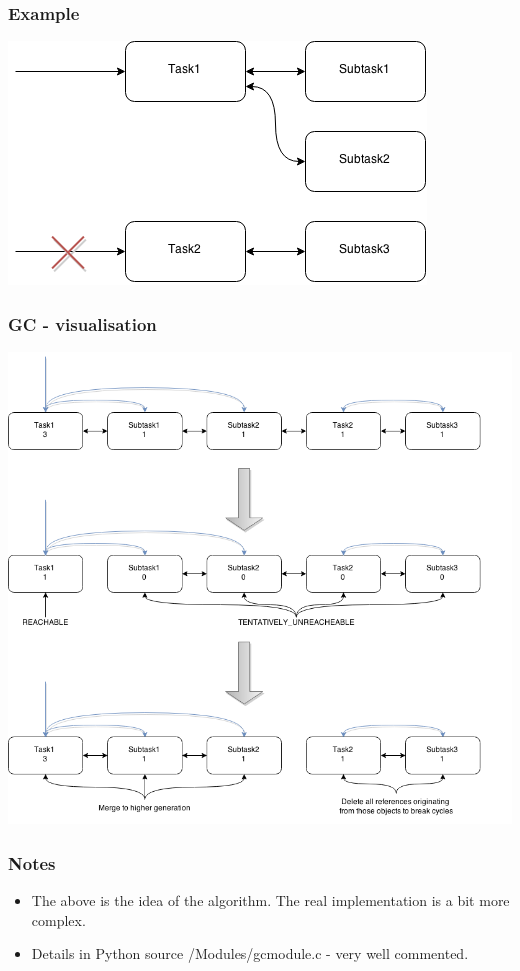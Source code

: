 \documentclass{beamer}
\begin{document}
    \begin{frame}
        \frametitle{Example}
        \begin{center}
            \includegraphics[height=0.5\textheight]{graph_remove.png}
        \end{center}
    \end{frame}

    \begin{frame}
        \frametitle{GC - visualisation}
        \begin{center}
            \includegraphics[height=0.8\textheight]{full_gc_drawing.png}
        \end{center}
    \end{frame}

    \begin{frame}
        \frametitle{Notes}
        \begin{itemize}
            \item The above is the idea of the algorithm. The real implementation is a bit more complex.
            \item Details in Python source /Modules/gcmodule.c - very well commented.
        \end{itemize}
    \end{frame}
\end{document}
